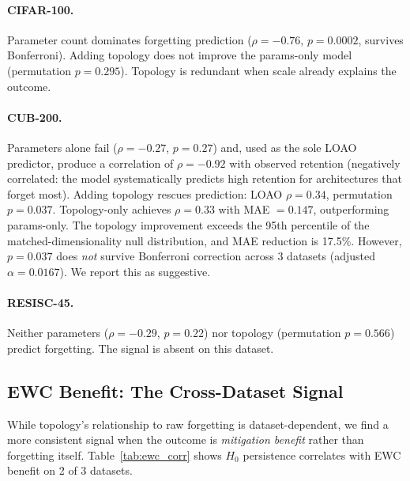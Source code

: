 \documentclass[10pt,twocolumn]{article}
\begin{document}
\paragraph{CIFAR-100.} Parameter count dominates forgetting prediction ($\rho = -0.76$, $p = 0.0002$, survives Bonferroni). Adding topology does not improve the params-only model (permutation $p = 0.295$). Topology is redundant when scale already explains the outcome.

\paragraph{CUB-200.} Parameters alone fail ($\rho = -0.27$, $p = 0.27$) and, used as the sole LOAO predictor, produce a correlation of $\rho = -0.92$ with observed retention (negatively correlated: the model systematically predicts high retention for architectures that forget most). Adding topology rescues prediction: LOAO $\rho = 0.34$, permutation $p = 0.037$. Topology-only achieves $\rho = 0.33$ with MAE $= 0.147$, outperforming params-only. The topology improvement exceeds the 95th percentile of the matched-dimensionality null distribution, and MAE reduction is 17.5\%. However, $p = 0.037$ does \emph{not} survive Bonferroni correction across 3 datasets (adjusted $\alpha = 0.0167$). We report this as suggestive.

\paragraph{RESISC-45.} Neither parameters ($\rho = -0.29$, $p = 0.22$) nor topology (permutation $p = 0.566$) predict forgetting. The signal is absent on this dataset.

\subsection{EWC Benefit: The Cross-Dataset Signal}
\label{sec:ewc_benefit}

While topology's relationship to raw forgetting is dataset-dependent, we find a more consistent signal when the outcome is \emph{mitigation benefit} rather than forgetting itself. Table~\ref{tab:ewc_corr} shows $H_0$ persistence correlates with EWC benefit on 2 of 3 datasets.
\end{document}
